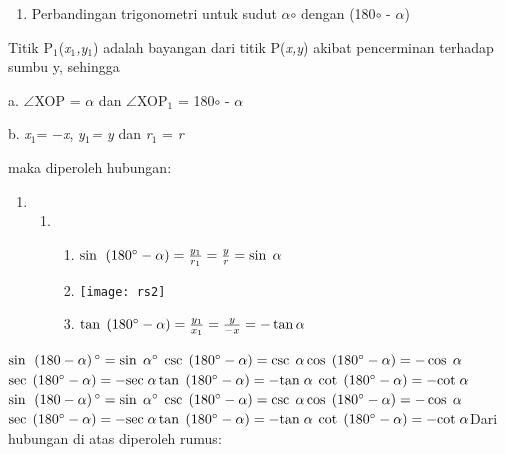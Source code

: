 \documentclass[11pt,fleqn]{book} %
\begin{document}
\begin{myEnumerate}
\begin{itemize}
\noindent 

\begin{enumerate}
\item  Perbandingan trigonometri untuk sudut $\alpha$$\circ$ dengan (180$\circ$ - $\alpha$)
\end{enumerate}

\noindent Titik P${}_{1}$(\textit{x}${}_{1}$\textit{,y}${}_{1}$) adalah bayangan dari titik P(\textit{x,y}) akibat pencerminan terhadap sumbu y, sehingga 

\noindent a. $\angle$XOP = $\alpha$ dan $\angle$XOP${}_{1}$ = 180$\circ$ - $\alpha$

\noindent b.  \textit{x}${}_{1 }$= $-$\textit{x}, \textit{y}${}_{1}$\textit{${}_{ }$= y} dan \textit{r}${}_{1}$ = \textit{r}

maka diperoleh hubungan: 

\begin{enumerate}
\item \begin{enumerate}
\item \begin{enumerate}
\item  $\sin {\rm \; }\left(180{}^\circ -\alpha \right)=\frac{y_{1} }{r_{1} } =\frac{y}{r} =\sin {\rm \; }\alpha $

\item  \texttt{[image: rs2]}

\item  ${\rm tan\; }\left(180{}^\circ -\alpha \right)=\frac{y_{1} }{x_{1} } =\frac{y}{-x} =-\tan \alpha $
\end{enumerate}
\end{enumerate}
\end{enumerate}

\noindent $\sin {\rm \; }\left(180-\alpha \right){}^\circ =\sin {\rm \; }\alpha {}^\circ $  ${\rm csc\; }\left(180{}^\circ -\alpha \right)=\csc {\rm \; }\alpha $${\rm cos\; }\left(180{}^\circ -\alpha \right)=-\cos {\rm \; }\alpha $ ${\rm sec\; }\left(180{}^\circ -\alpha \right)=-{\rm sec\; }\alpha $${\rm tan\; }\left(180{}^\circ -\alpha \right)=-{\rm tan\; }\alpha $ ${\rm cot\; }\left(180{}^\circ -\alpha \right)=-{\rm cot\; }\alpha $$\sin {\rm \; }\left(180-\alpha \right){}^\circ =\sin {\rm \; }\alpha {}^\circ $  ${\rm csc\; }\left(180{}^\circ -\alpha \right)=\csc {\rm \; }\alpha $${\rm cos\; }\left(180{}^\circ -\alpha \right)=-\cos {\rm \; }\alpha $ ${\rm sec\; }\left(180{}^\circ -\alpha \right)=-{\rm sec\; }\alpha $${\rm tan\; }\left(180{}^\circ -\alpha \right)=-{\rm tan\; }\alpha $ ${\rm cot\; }\left(180{}^\circ -\alpha \right)=-{\rm cot\; }\alpha $Dari hubungan di atas diperoleh rumus:


\end{itemize}
\end{myEnumerate}
\end{document}
